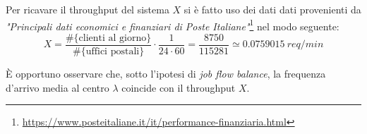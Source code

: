 Per ricavare il throughput del sistema $X$ si è fatto uso dei dati dati provenienti da \textsl{"Principali dati economici e finanziari di Poste Italiane"}\footnote{\url{https://www.posteitaliane.it/it/performance-finanziaria.html}} nel modo seguente:
\begin{equation}
X = \frac{\# \lbrace \text{clienti al giorno} \rbrace}{\# \lbrace \text{uffici postali} \rbrace} \cdot \frac{1}{24 \cdot 60} = \frac{8750}{115281} \simeq 0.0759015\ req/min
\end{equation} 

È opportuno osservare che, sotto l'ipotesi di \textsl{job flow balance}, la frequenza d'arrivo media al centro $\lambda$ coincide con il throughput $X$.


















